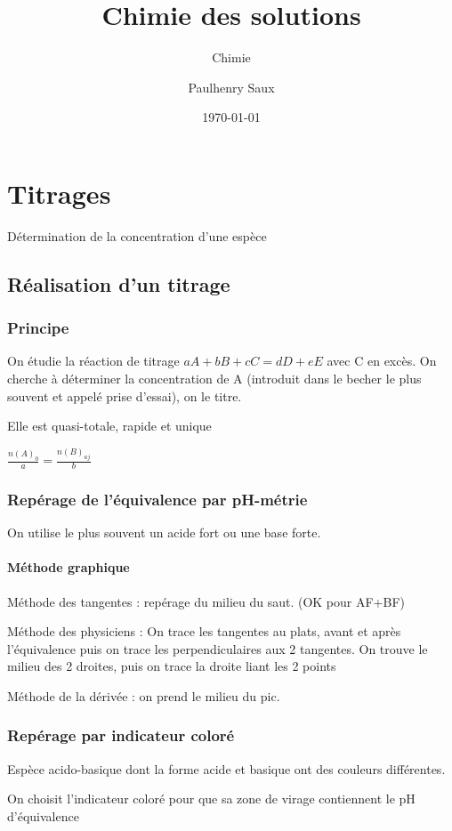 \documentclass[french]{yLectureNote}
\title{Chimie des solutions}
\subtitle{Chimie}
\author{Paulhenry Saux}
\date{\today}
\begin{document}
\setcounter{chapter}{5}
\chapter{Titrages }
\begin{definition}[Dosage]
Détermination de la concentration d'une espèce
\end{definition}
\section{Réalisation d'un titrage}
\subsection{Principe}
On étudie la réaction de titrage \(aA+bB+cC = dD+eE\) avec C en excès. On cherche à déterminer la concentration de A (introduit dans le becher le plus souvent et appelé prise d'essai), on le titre.
\begin{proposition}
Elle est quasi-totale, rapide et unique
\end{proposition}
\begin{proposition}
\(\frac{n(A)_0}{a} = \frac{n(B)_{aj}}{b}\)
\end{proposition}
\subsection{Repérage de l'équivalence par pH-métrie}
On utilise le plus souvent un acide fort ou une base forte.
\subsubsection{Méthode graphique}
Méthode des tangentes : repérage du milieu du saut. (OK pour AF+BF)

Méthode des physiciens : On trace les tangentes au plats, avant et après l'équivalence puis on trace les perpendiculaires aux 2 tangentes. On trouve le milieu des 2 droites, puis on trace la droite liant les 2 points

Méthode de la dérivée : on prend le milieu du pic.
\subsection{Repérage par indicateur coloré}
\begin{definition}
Espèce acido-basique dont la forme acide et basique ont des couleurs différentes.
\end{definition}
On choisit l'indicateur coloré pour que sa zone de virage contiennent le pH d'équivalence
\end{document}
